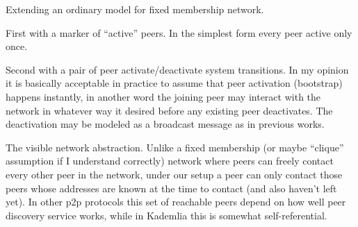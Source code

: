 Extending an ordinary model for fixed membership network.

First with a marker of ``active'' peers.
In the simplest form every peer active only once.

Second with a pair of peer activate/deactivate system transitions.
In my opinion it is basically acceptable in practice to assume that peer activation (\ie bootstrap) happens instantly, in another word the joining peer may interact with the network in whatever way it desired before any existing peer deactivates.
The deactivation may be modeled as a broadcast message as in previous works.

The visible network abstraction.
Unlike a fixed membership (or maybe ``clique'' assumption if I understand correctly) network where peers can freely contact every other peer in the network, under our setup a peer can only contact those peers whose addresses are known at the time to contact (and also haven't left yet).
In other p2p protocols this set of reachable peers depend on how well peer discovery service works, while in Kademlia this is somewhat self-referential.
